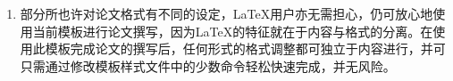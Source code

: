 \begin{enumerate}
\begin{itemize}
             这一命令使产生空白页的机制失效。这一方案将移除所有的空白页，包括封面处的。但与方案一不同的是，页面页脚的设定可以区分奇偶页。
         \item 在thesis.tex的documentclass中添加openany选项(openany与doublesided和printcopy都可搭配)。这一命令使章可以开始于任意页。同时，将artratex.sty中和thesis.tex中的cleardoublepage改为clearpage。此方案将移除所有的用于调整章的起始位置的空白页，而不包括封面处的。同时，页面页脚的设定可以区分奇偶页。
     \end{itemize}
      无论哪种方案都要注意对页眉页脚的影响并做出合适的调整。推荐是采用默认设置，尽量避免将精力花在这些无关紧要的细节上。\LaTeX{}的特点是标准化，而其导致的问题则是任何脱离标准的修改都将花费相当精力。对于电子档的论文，在thesis.tex的documentclass中，若不想使用doublesided，则可使用singlesided来减少空白页。而对于打印版，启用printcopy选项以替换doublesided/singlesided选项，这样可使奇偶页的排版在打印装订后更美观。

  \item 部分所也许对论文格式有不同的设定，\LaTeX{}用户亦无需担心，仍可放心地使用当前模板进行论文撰写，因为\LaTeX{}的特征就在于内容与格式的分离。在使用此模板完成论文的撰写后，任何形式的格式调整都可独立于内容进行，并可只需通过修改模板样式文件中的少数命令轻松快速完成，并无风险。
\end{enumerate}


